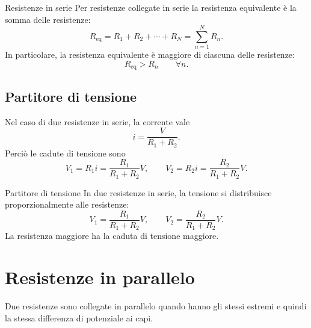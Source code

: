 \documentclass[a4paper]{article}
\begin{document}
\begin{snippetproposition}{Resistenze in serie}
    Per resistenze collegate in serie la resistenza equivalente è la somma delle resistenze:
    \[
        R_{\mathrm{eq}}=R_1+R_2+\cdots+R_N=\sum_{n=1}^N R_n.
    \]
    In particolare, la resistenza equivalente è maggiore di ciascuna delle resistenze:
    \[
        R_{\mathrm{eq}}>R_n\qquad \forall n.
    \]
\end{snippetproposition}

\subsection{Partitore di tensione}

Nel caso di due resistenze in serie, la corrente vale
\[
    i=\frac{V}{R_1+R_2}.
\]
Perciò le cadute di tensione sono
\[
    V_1=R_1i=\frac{R_1}{R_1+R_2}V,
    \qquad
    V_2=R_2i=\frac{R_2}{R_1+R_2}V.
\]

\begin{snippetproposition}{Partitore di tensione}
    In due resistenze in serie, la tensione si distribuisce proporzionalmente alle resistenze:
    \[
        V_1=\frac{R_1}{R_1+R_2}V,
        \qquad
        V_2=\frac{R_2}{R_1+R_2}V.
    \]
    La resistenza maggiore ha la caduta di tensione maggiore.
\end{snippetproposition}

\section{Resistenze in parallelo}

Due resistenze sono collegate in parallelo quando hanno gli stessi estremi e quindi la stessa differenza di potenziale ai capi.

\begin{center}
\end{center}
\end{document}
